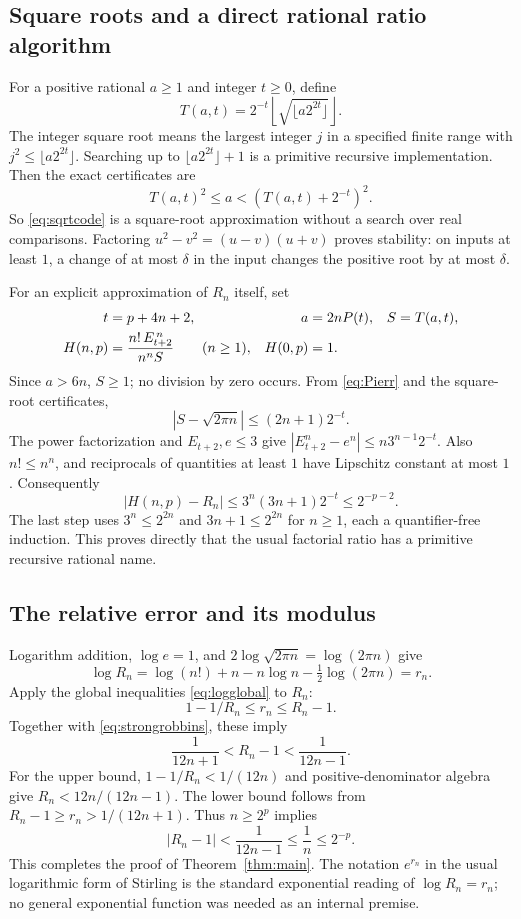 \documentclass[11pt]{article}
\theoremstyle{definition}
\newcommand{\abs}[1]{\left|#1\right|}
\begin{document}
\subsection{Square roots and a direct rational ratio algorithm}

For a positive rational $a\ge1$ and integer $t\ge0$, define
\begin{equation}\label{eq:sqrtcode}
 T(a,t)=2^{-t}\left\lfloor\sqrt{\lfloor a2^{2t}\rfloor}\right\rfloor.
\end{equation}
The integer square root means the largest integer $j$ in a specified
finite range with $j^2\le\lfloor a2^{2t}\rfloor$. Searching up to
$\lfloor a2^{2t}\rfloor+1$ is a primitive recursive implementation.
Then the exact certificates are
\[
 T(a,t)^2\le a<(T(a,t)+2^{-t})^2.
\]
So \eqref{eq:sqrtcode} is a square-root approximation without a search
over real comparisons. Factoring $u^2-v^2=(u-v)(u+v)$ proves stability:
on inputs at least $1$, a change of at most $\delta$ in the input changes
the positive root by at most $\delta$.

For an explicit approximation of $R_n$ itself, set
\begin{align}
 t&=p+4n+2,& a&=2nP(t),& S&=T(a,t),\notag\\
 H(n,p)&=\frac{n!\,E_{t+2}^{\,n}}{n^nS}\qquad(n\ge1),
 &H(0,p)&=1.\label{eq:H}
\end{align}
Since $a>6n$, $S\ge1$; no division by zero occurs. From
\eqref{eq:Pierr} and the square-root certificates,
\[
 \abs{S-\sqrt{2\pi n}}\le(2n+1)2^{-t}.
\]
The power factorization and $E_{t+2},e\le3$ give
$\abs{E_{t+2}^n-e^n}\le n3^{n-1}2^{-t}$.
Also $n!\le n^n$, and reciprocals of quantities at least $1$ have
Lipschitz constant at most $1$. Consequently
\begin{equation}\label{eq:Herr}
 \abs{H(n,p)-R_n}
 \le3^n(3n+1)2^{-t}\le2^{-p-2}.
\end{equation}
The last step uses $3^n\le2^{2n}$ and $3n+1\le2^{2n}$ for $n\ge1$,
each a quantifier-free induction. This proves directly that the usual
factorial ratio has a primitive recursive rational name.

\subsection{The relative error and its modulus}

Logarithm addition, $\log e=1$, and
$2\log\sqrt{2\pi n}=\log(2\pi n)$ give
\[
 \log R_n
 =\log(n!)+n-n\log n-\tfrac12\log(2\pi n)=r_n.
\]
Apply the global inequalities \eqref{eq:logglobal} to $R_n$:
\[
 1-1/R_n\le r_n\le R_n-1.
\]
Together with \eqref{eq:strongrobbins}, these imply
\begin{equation}\label{eq:relativeboth}
 \frac1{12n+1}<R_n-1<\frac1{12n-1}.
\end{equation}
For the upper bound, $1-1/R_n<1/(12n)$ and positive-denominator
algebra give $R_n<12n/(12n-1)$. The lower bound follows from
$R_n-1\ge r_n>1/(12n+1)$.
Thus $n\ge2^p$ implies
\[
 \abs{R_n-1}<\frac1{12n-1}\le\frac1n\le2^{-p}.
\]
This completes the proof of Theorem~\ref{thm:main}. The notation
$e^{r_n}$ in the usual logarithmic form of Stirling is the standard
exponential reading of $\log R_n=r_n$; no general exponential function
was needed as an internal premise.
\end{document}
